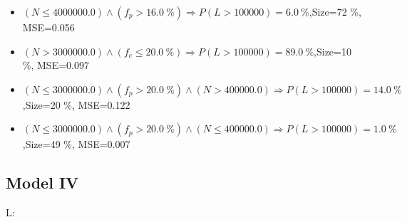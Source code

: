 \documentclass[numbered]{CSL}
\begin{document}
\begin{itemize}
\item $(N \leq 4000000.0) \land (f_p > 16.0~\%) \Rightarrow P(L > 100 000) = 6.0~\%$,\hfill Size=72 \%, MSE=0.056
\item $(N > 3000000.0) \land (f_c \leq 20.0~\%) \Rightarrow P(L > 100 000) = 89.0~\%$,\hfill Size=10 \%, MSE=0.097
\item $(N \leq 3000000.0) \land (f_p > 20.0~\%) \land (N > 400000.0) \Rightarrow P(L > 100 000) = 14.0~\%$,\hfill Size=20 \%, MSE=0.122
\item $(N \leq 3000000.0) \land (f_p > 20.0~\%) \land (N \leq 400000.0) \Rightarrow P(L > 100 000) = 1.0~\%$,\hfill Size=49 \%, MSE=0.007
\end{itemize}

\subsection{Model IV}
L:
\end{document}
